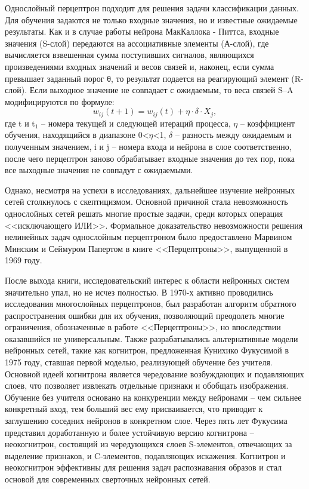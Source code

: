  Однослойный перцептрон подходит для решения задачи классификации данных. Для обучения задаются не только входные значения, но и известные ожидаемые результаты. Как и в случае работы нейрона МакКаллока - Питтса, входные значения (S-слой) передаются на ассоциативные элементы (А-слой), где вычисляется взвешенная сумма поступивших сигналов, являющихся произведениями входных значений и весов связей и, наконец, если сумма превышает заданный порог θ, то результат подается на реагирующий элемент (R-слой). Если выходное значение не совпадает с ожидаемым, то веса связей S--A модифицируются по формуле:
 \[
 w_{ij}(t+1) = w_{ij}(t) + \eta \cdot \delta \cdot X_{j},
 \]
 где t и t$_{1}$ -- номера текущей и следующей итераций процесса, $\eta$ -- коэффициент обучения, находящийся в диапазоне 0<$\eta$<1, $\delta$ -- разность между ожидаемым и полученным значением, i и j -- номера входа и нейрона в слое соответственно, после чего перцептрон заново обрабатывает входные значения до тех пор, пока все выходные значения не совпадут с ожидаемыми. 
 
 Однако, несмотря на успехи в исследованиях, дальнейшее изучение нейронных сетей столкнулось с скептицизмом. Основной причиной стала невозможность однослойных сетей решать многие простые задачи, среди которых операция <<исключающего ИЛИ>>. Формальное доказательство невозможности решения нелинейных задач однослойным перцептроном было предоставлено Марвином Минским и Сеймуром Папертом в книге <<Перцептроны>>, выпущенной в 1969 году. 
 
 После выхода книги, исследовательский интерес к области нейронных систем значительно упал, но не исчез полностью. В 1970-х активно проводились исследования многослойных перцептронов, был разработан алгоритм обратного распространения ошибки для их обучения, позволяющий преодолеть многие ограничения, обозначенные в работе <<Перцептроны>>, но впоследствии оказавшийся не универсальным. Также разрабатывались альтернативные модели нейронных сетей, такие как когнитрон, предложенная Кунихико Фукусимой в 1975 году, ставшая первой моделью, реализующей обучение без учителя. Основной идеей когнитрона является чередование возбуждающих и подавляющих слоев, что позволяет извлекать отдельные признаки и обобщать изображения. Обучение без учителя основано на конкуренции между нейронами -- чем сильнее конкретный вход, тем больший вес ему присваивается, что приводит к заглушению соседних нейронов в конкретном слое. Через пять лет Фукусима представил доработанную и более устойчивую версию когнитрона -- неокогнитрон, состоящий из чередующихся слоев S-элементов, отвечающих за выделение признаков, и C-элементов, подавляющих искажения. Когнитрон и неокогнитрон эффективны для решения задач распознавания образов и стал основой для современных сверточных нейронных сетей. 
 
